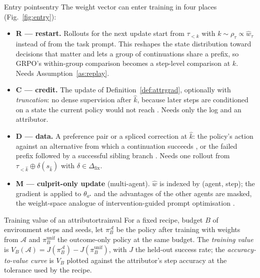 \documentclass[10pt,a4paper]{article}
\begin{document}
\begin{definition}{Entry points}{entry}
The weight vector can enter training in four places (Fig.~\ref{fig:entry}):
\begin{itemize}[leftmargin=1.1em]
\item \textbf{R --- restart.} Rollouts for the next update start from $\tau_{<k}$ with $k\sim\rho_\tau\propto\hat w_\tau$ instead of from the task prompt. This reshapes the state distribution toward decisions that matter and lets a group of continuations share a prefix, so GRPO's within-group comparison becomes a step-level comparison at $k$. Needs Assumption~\ref{as:replay}.
\item \textbf{C --- credit.} The update of Definition~\ref{def:attrgrad}, optionally with \emph{truncation}: no dense supervision after $\hat k$, because later steps are conditioned on a state the current policy would not reach \cite{huang2026etro,guo2026pivoarl}. Needs only the log and an attributor.
\item \textbf{D --- data.} A preference pair or a spliced correction at $\hat k$: the policy's action against an alternative from which a continuation succeeds \cite{li2026cso}, or the failed prefix followed by a successful sibling branch \cite{yuan2025agentr}. Needs one rollout from $\tau_{<\hat k}\oplus\delta(s_{\hat k})$ with $\delta\in\Delta_{\mathrm{fix}}$.
\item \textbf{M --- culprit-only update} (multi-agent). $\hat w$ is indexed by (agent, step); the gradient is applied to $\theta_{a^\star}$ and the advantages of the other agents are masked, the weight-space analogue of intervention-guided prompt optimisation \cite{chu2026agentgrad}.
\end{itemize}
\end{definition}

\begin{definition}{Training value of an attributor}{trainval}
For a fixed recipe, budget $B$ of environment steps and seeds, let $\pi^{\mathcal{A}}_B$ be the policy after training with weights from $\mathcal{A}$ and $\pi^{\mathrm{unif}}_B$ the outcome-only policy at the same budget. The \emph{training value} is $V_B(\mathcal{A})=J(\pi^{\mathcal{A}}_B)-J(\pi^{\mathrm{unif}}_B)$, with $J$ the held-out success rate; the \emph{accuracy-to-value curve} is $V_B$ plotted against the attributor's step accuracy at the tolerance used by the recipe.
\end{definition}
\end{document}
